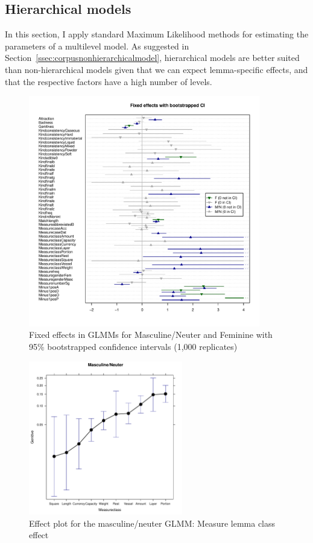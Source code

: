 \documentclass[USenglish]{article}
\begin{document}
\subsection{Hierarchical models}
\label{ssec:corpushierarchicalmodel}

In this section, I apply standard Maximum Likelihood methods for estimating the parameters of a multilevel model.
As suggested in Section~\ref{ssec:corpusnonhierarchicalmodel}, hierarchical models are better suited than non-hierarchical models given that we can expect lemma-specific effects, and that the respective factors have a high number of levels.

\begin{figure}[h]
\centering
\includegraphics[width=0.9\textwidth]{figures/corpus/04_glmm_fixef.pdf}
\caption{Fixed effects in GLMMs for Masculine\slash Neuter and Feminine with 95\% bootstrapped confidence intervals (1,000 replicates)}
\label{fig:glmmfixef}
\end{figure}


\begin{figure}[h]
\centering
\includegraphics[width=0.6\textwidth]{figures/corpus/04_glmm_fixeff_mn_Measureclass}
\caption{Effect plot for the masculine\slash neuter GLMM: Measure lemma class effect}
\label{fig:glmm:fixef:measureclass}
\end{figure}
\end{document}
